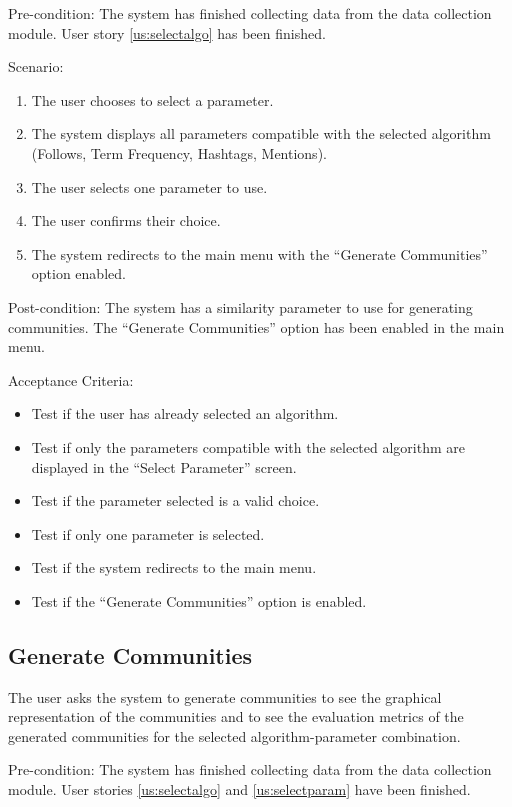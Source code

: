 Pre-condition: The system has finished collecting data from the data collection module. User story \ref{us:selectalgo} has been finished.


Scenario:
\begin{enumerate}
	\item The user chooses to select a parameter.
	\item The system displays all parameters compatible with the selected algorithm (Follows, Term Frequency, Hashtags, Mentions).
	\item The user selects one parameter to use.
	\item The user confirms their choice.
	\item The system redirects to the main menu with the ``Generate Communities'' option enabled.
\end{enumerate}


Post-condition: The system has a similarity parameter to use for generating communities. The ``Generate Communities'' option
has been enabled in the main menu.


Acceptance Criteria:
\begin{itemize}
	\item Test if the user has already selected an algorithm.
	\item Test if only the parameters compatible with the selected algorithm are displayed in the ``Select Parameter'' screen.
	\item Test if the parameter selected is a valid choice.
	\item Test if only one parameter is selected.
	\item Test if the system redirects to the main menu.
	\item Test if the ``Generate Communities'' option is enabled.
\end{itemize}


\subsection{Generate Communities}
\label{us:gencom}


The user asks the system to generate communities to see the graphical representation of the communities and to see the 
evaluation metrics of the generated communities for the selected algorithm-parameter combination.


Pre-condition: The system has finished collecting data from the data collection module. User stories \ref{us:selectalgo} and \ref{us:selectparam} have been finished.



